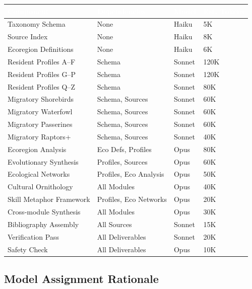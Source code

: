 \documentclass[11pt,letterpaper]{article}
\newcommand{\tableheader}[1]{\textbf{\sffamily\textcolor{white}{#1}}}
\begin{document}
\begin{center}
\begin{tabularx}{\textwidth}{L{3cm}L{2.5cm}C{1.5cm}C{2cm}}
\toprule
{}
\tableheader{Component} & \tableheader{Dependencies} & \tableheader{Model} & \tableheader{Est. Tokens} \\
\midrule
Taxonomy Schema & None & Haiku & 5K \\
Source Index & None & Haiku & 8K \\
Ecoregion Definitions & None & Haiku & 6K \\
Resident Profiles A--F & Schema & Sonnet & 120K \\
Resident Profiles G--P & Schema & Sonnet & 120K \\
Resident Profiles Q--Z & Schema & Sonnet & 80K \\
Migratory Shorebirds & Schema, Sources & Sonnet & 60K \\
Migratory Waterfowl & Schema, Sources & Sonnet & 60K \\
Migratory Passerines & Schema, Sources & Sonnet & 60K \\
Migratory Raptors+ & Schema, Sources & Sonnet & 40K \\
Ecoregion Analysis & Eco Defs, Profiles & Opus & 80K \\
Evolutionary Synthesis & Profiles, Sources & Opus & 60K \\
Ecological Networks & Profiles, Eco Analysis & Opus & 50K \\
Cultural Ornithology & All Modules & Opus & 40K \\
Skill Metaphor Framework & Profiles, Eco Networks & Opus & 20K \\
Cross-module Synthesis & All Modules & Opus & 30K \\
Bibliography Assembly & All Sources & Sonnet & 15K \\
Verification Pass & All Deliverables & Sonnet & 20K \\
Safety Check & All Deliverables & Opus & 10K \\
\bottomrule
\end{tabularx}
\end{center}

\subsection{Model Assignment Rationale}
\end{document}
